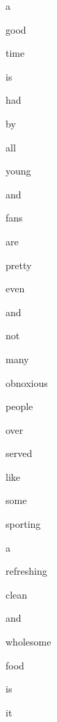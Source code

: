 \documentclass[varwidth]{standalone}
\begin{document}
 \begin{CJK*}{UTF8}{gbsn} 
{\setlength{\fboxsep}{0pt}\colorbox{white!0}{\parbox{0.9\textwidth}{
\colorbox{red!25.409591674804688}{\strut a} 
\colorbox{red!5.242115497589111}{\strut good} 
\colorbox{red!15.528890609741211}{\strut time} 
\colorbox{red!0.0}{\strut is} 
\colorbox{red!8.50400447845459}{\strut had} 
\colorbox{red!15.655128479003906}{\strut by} 
\colorbox{red!36.50725555419922}{\strut all} 
\colorbox{red!50.278663635253906}{\strut young} 
\colorbox{red!8.050776481628418}{\strut and} 
\colorbox{red!100.0}{\strut fans} 
\colorbox{red!11.881501197814941}{\strut are} 
\colorbox{red!12.22339153289795}{\strut pretty} 
\colorbox{red!16.983226776123047}{\strut even} 
\colorbox{red!11.288995742797852}{\strut and} 
\colorbox{red!18.425586700439453}{\strut not} 
\colorbox{red!52.32585144042969}{\strut many} 
\colorbox{red!20.501216888427734}{\strut obnoxious} 
\colorbox{red!65.07975769042969}{\strut people} 
\colorbox{red!8.464975357055664}{\strut over} 
\colorbox{red!14.951287269592285}{\strut served} 
\colorbox{red!1.2501978874206543}{\strut like} 
\colorbox{red!63.62171173095703}{\strut some} 
\colorbox{red!9.118228912353516}{\strut sporting} 
\colorbox{red!36.69622802734375}{\strut a} 
\colorbox{red!15.314973831176758}{\strut refreshing} 
\colorbox{red!5.526485443115234}{\strut clean} 
\colorbox{red!0.9303948879241943}{\strut and} 
\colorbox{red!21.7628173828125}{\strut wholesome} 
\colorbox{red!16.501737594604492}{\strut food} 
\colorbox{red!19.030649185180664}{\strut is} 
\colorbox{red!27.155738830566406}{\strut it} 

}}}\end{CJK*}
\end{document}
